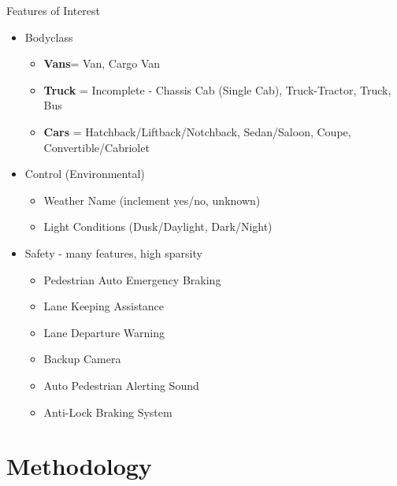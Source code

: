 \documentclass{beamer}
\begin{document}
\begin{frame}{Features of Interest}
    \begin{itemize}
        \item Bodyclass
            \begin{itemize}
                \item \textbf{Vans}= Van, Cargo Van
                \item \textbf{Truck} = Incomplete - Chassis Cab (Single Cab), Truck-Tractor, Truck, Bus
                \item \textbf{Cars} = Hatchback/Liftback/Notchback, Sedan/Saloon, Coupe, Convertible/Cabriolet
            \end{itemize}
        \item Control (Environmental)
            \begin{itemize}
                \item Weather Name (inclement yes/no, unknown)
                \item Light Conditions (Dusk/Daylight, Dark/Night)
            \end{itemize}
        \item Safety - many features, high sparsity
            \begin{itemize}
                \item Pedestrian Auto Emergency Braking
                \item Lane Keeping Assistance
                \item Lane Departure Warning
                \item Backup Camera
                \item Auto Pedestrian Alerting Sound
                \item Anti-Lock Braking System
            \end{itemize}
    \end{itemize}
\end{frame}


\section{Methodology}
\end{document}

